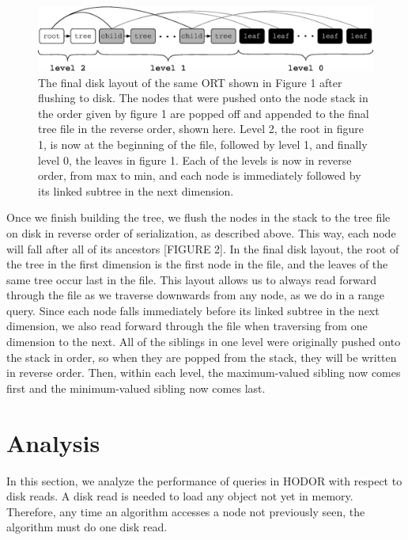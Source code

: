 \documentclass[11pt, oneside]{article}
\begin{document}
\begin{figure}[h!]
    \centering
    \includegraphics[width=1\textwidth]{fig2.eps}
    \caption{
        The final disk layout of the same ORT shown in Figure 1 after flushing
        to disk. The nodes that were pushed onto the node stack in the order
        given by figure 1 are popped off and appended to the final tree file in
        the reverse order, shown here. Level 2, the root in figure 1, is now at
        the beginning of the file, followed by level 1, and finally level 0,
        the leaves in figure 1. Each of the levels is now in reverse order,
        from max to min, and each node is immediately followed by its linked
        subtree in the next dimension. 
    }
    \vspace{0.5in}
\end{figure}

Once we finish building the tree, we flush the nodes in the stack to the tree file on disk
in reverse order of serialization, as described above. This way, each node will
fall after all of its ancestors [FIGURE 2]. In the final disk layout, the root
of the tree in the first dimension is the first node in the file, and the leaves
of the same tree occur last in the file. This layout allows us to always read
forward through the file as we traverse downwards from any node, as we do in a
range query. Since each node falls immediately before its linked subtree in the
next dimension, we also read forward through the file when traversing from one
dimension to the next. All of the siblings in one level were originally pushed
onto the stack in order, so when they are popped from the stack, they will be
written in reverse order. Then, within each level, the maximum-valued sibling
now comes first and the minimum-valued sibling now comes last. 

\section{Analysis}

In this section, we analyze the performance of queries in HODOR with respect to
disk reads. A disk read is needed to load any object not yet in memory.
Therefore, any time an algorithm accesses a node not previously seen, the
algorithm must do one disk read.
\end{document}
